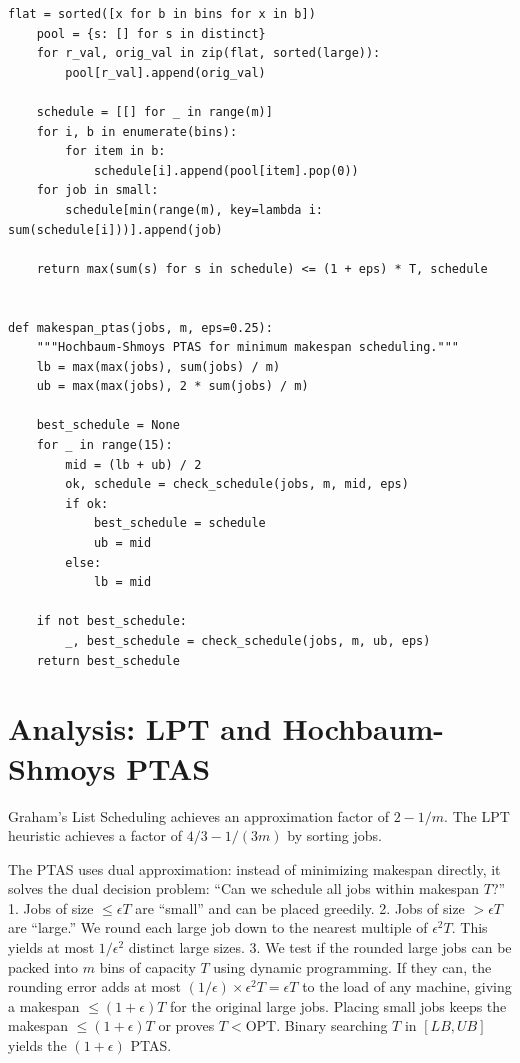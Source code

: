 \begin{lstlisting}[style=python, caption=Hochbaum-Shmoys PTAS for Minimum Makespan]
    flat = sorted([x for b in bins for x in b])
    pool = {s: [] for s in distinct}
    for r_val, orig_val in zip(flat, sorted(large)):
        pool[r_val].append(orig_val)

    schedule = [[] for _ in range(m)]
    for i, b in enumerate(bins):
        for item in b:
            schedule[i].append(pool[item].pop(0))
    for job in small:
        schedule[min(range(m), key=lambda i: sum(schedule[i]))].append(job)

    return max(sum(s) for s in schedule) <= (1 + eps) * T, schedule


def makespan_ptas(jobs, m, eps=0.25):
    """Hochbaum-Shmoys PTAS for minimum makespan scheduling."""
    lb = max(max(jobs), sum(jobs) / m)
    ub = max(max(jobs), 2 * sum(jobs) / m)

    best_schedule = None
    for _ in range(15):
        mid = (lb + ub) / 2
        ok, schedule = check_schedule(jobs, m, mid, eps)
        if ok:
            best_schedule = schedule
            ub = mid
        else:
            lb = mid

    if not best_schedule:
        _, best_schedule = check_schedule(jobs, m, ub, eps)
    return best_schedule
\end{lstlisting}

\section{Analysis: LPT and Hochbaum-Shmoys PTAS}
Graham's List Scheduling achieves an approximation factor of $2 - 1/m$. The LPT heuristic achieves a factor of $4/3 - 1/(3m)$ by sorting jobs.

The PTAS uses dual approximation: instead of minimizing makespan directly, it solves the dual decision problem: ``Can we schedule all jobs within makespan $T$?''
1.  Jobs of size $\le \epsilon T$ are ``small'' and can be placed greedily.
2.  Jobs of size $> \epsilon T$ are ``large.'' We round each large job down to the nearest multiple of $\epsilon^2 T$. This yields at most $1/\epsilon^2$ distinct large sizes.
3.  We test if the rounded large jobs can be packed into $m$ bins of capacity $T$ using dynamic programming.
If they can, the rounding error adds at most $(1/\epsilon) \times \epsilon^2 T = \epsilon T$ to the load of any machine, giving a makespan $\le (1+\epsilon)T$ for the original large jobs. Placing small jobs keeps the makespan $\le (1+\epsilon)T$ or proves $T < \text{OPT}$. Binary searching $T$ in $[LB, UB]$ yields the $(1+\epsilon)$ PTAS.

